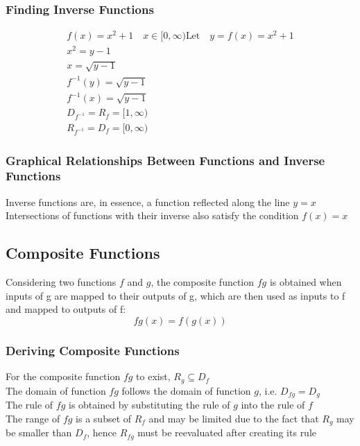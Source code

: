 \documentclass[../main]{subfiles}
\begin{document}
	\subsubsection{Finding Inverse Functions}
	\begin{equation*} \begin{gathered}
		f(x) = x^2 + 1 \quad x \in [0,\infty)
		\text{Let} \quad y = f(x) = x^2 + 1 \\
		x^2 = y - 1 \\
		x = \sqrt{y - 1} \\
		f^{-1}(y) = \sqrt{y-1} \\
		f^{-1}(x) = \sqrt{y-1} \\
		D_{f^{-1}} = R_f = [1,\infty) \\
		R_{f^{-1}} = D_f = [0,\infty) 
	\end{gathered} \end{equation*}
	\subsubsection{Graphical Relationships Between Functions and Inverse Functions}
	Inverse functions are, in essence, a function reflected along the line \(y=x\) \\
	Intersections of functions with their inverse also satisfy the condition \(f(x)=x\) 

\subsection{Composite Functions}
	Considering two functions \(f\) and \(g\), the composite function \(fg\) is obtained when inputs of g are mapped to their outputs of g, which are then used as inputs to f and mapped to outputs of f:
	\[ fg(x) = f(g(x)) \]
	\subsubsection{Deriving Composite Functions}
	For the composite function \(fg\) to exist, \(R_g \subseteq D_f\) \\
	The domain of function \(fg\) follows the domain of function \(g\), i.e. \(D_{fg} = D_g\) \\
	The rule of \(fg\) is obtained by substituting the rule of \(g\) into the rule of \(f\) \\
	The range of \(fg\) is a subset of \(R_f\) and may be limited due to the fact that \(R_g\) may be smaller than  \(D_f\), hence \(R_{fg}\) must be reevaluated after creating its rule
\end{document}
